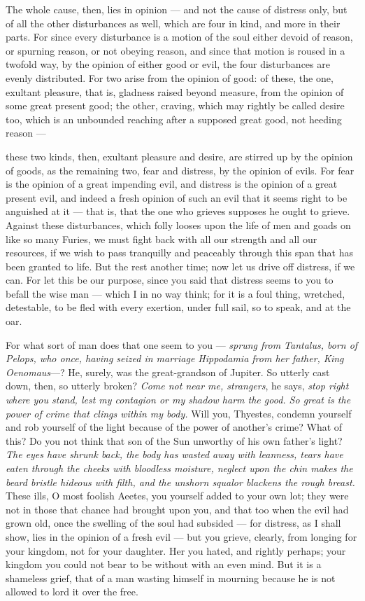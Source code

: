  The whole cause, then, lies in opinion — and not the cause of distress only, but of all the other disturbances as well, which are four in kind, and more in their parts. For since every disturbance is a motion of the soul either devoid of reason, or spurning reason, or not obeying reason, and since that motion is roused in a twofold way, by the opinion of either good or evil, the four disturbances are evenly distributed. For two arise from the opinion of good: of these, the one, exultant pleasure, that is, gladness raised beyond measure, from the opinion of some great present good; the other, craving, which may rightly be called desire too, which is an unbounded reaching after a supposed great good, not heeding reason —

 these two kinds, then, exultant pleasure and desire, are stirred up by the opinion of goods, as the remaining two, fear and distress, by the opinion of evils. For fear is the opinion of a great impending evil, and distress is the opinion of a great present evil, and indeed a fresh opinion of such an evil that it seems right to be anguished at it — that is, that the one who grieves supposes he ought to grieve. Against these disturbances, which folly looses upon the life of men and goads on like so many Furies, we must fight back with all our strength and all our resources, if we wish to pass tranquilly and peaceably through this span that has been granted to life. But the rest another time; now let us drive off distress, if we can. For let this be our purpose, since you said that distress seems to you to befall the wise man — which I in no way think; for it is a foul thing, wretched, detestable, to be fled with every exertion, under full sail, so to speak, and at the oar.

 For what sort of man does that one seem to you — \textit{sprung from Tantalus, born of Pelops, who once, having seized in marriage Hippodamia from her father, King Oenomaus}—? He, surely, was the great-grandson of Jupiter. So utterly cast down, then, so utterly broken? \textit{Come not near me, strangers}, he says, \textit{stop right where you stand, lest my contagion or my shadow harm the good. So great is the power of crime that clings within my body.} Will you, Thyestes, condemn yourself and rob yourself of the light because of the power of another's crime? What of this? Do you not think that son of the Sun unworthy of his own father's light? \textit{The eyes have shrunk back, the body has wasted away with leanness, tears have eaten through the cheeks with bloodless moisture, neglect upon the chin makes the beard bristle hideous with filth, and the unshorn squalor blackens the rough breast.} These ills, O most foolish Aeetes, you yourself added to your own lot; they were not in those that chance had brought upon you, and that too when the evil had grown old, once the swelling of the soul had subsided — for distress, as I shall show, lies in the opinion of a fresh evil — but you grieve, clearly, from longing for your kingdom, not for your daughter. Her you hated, and rightly perhaps; your kingdom you could not bear to be without with an even mind. But it is a shameless grief, that of a man wasting himself in mourning because he is not allowed to lord it over the free.

